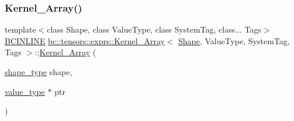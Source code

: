 \mbox{\label{structbc_1_1tensors_1_1exprs_1_1Kernel__Array_aabd83677fd69cc08ffdc444335bcfee5}} 
\subsubsection{\texorpdfstring{Kernel\+\_\+\+Array()}{Kernel\_Array()}\hspace{0.1cm}{\footnotesize\ttfamily [2/3]}}
{\footnotesize\ttfamily template$<$class Shape, class Value\+Type, class System\+Tag, class... Tags$>$ \\
\hyperlink{common_8h_a6699e8b0449da5c0fafb878e59c1d4b1}{B\+C\+I\+N\+L\+I\+NE} \hyperlink{structbc_1_1tensors_1_1exprs_1_1Kernel__Array}{bc\+::tensors\+::exprs\+::\+Kernel\+\_\+\+Array}$<$ \hyperlink{structbc_1_1Shape}{Shape}, Value\+Type, System\+Tag, Tags $>$\+::\hyperlink{structbc_1_1tensors_1_1exprs_1_1Kernel__Array}{Kernel\+\_\+\+Array} (\begin{DoxyParamCaption}\item[{\hyperlink{structbc_1_1tensors_1_1exprs_1_1Kernel__Array_ae6a4db456a47818cda06bb76d05a3b6e}{shape\+\_\+type}}]{shape,  }\item[{\hyperlink{structbc_1_1tensors_1_1exprs_1_1Kernel__Array_ae8195ebc960dd40b6c731a269c00e37b}{value\+\_\+type} $\ast$}]{ptr }\end{DoxyParamCaption})\hspace{0.3cm}{\ttfamily [inline]}}

\mbox{\label{structbc_1_1tensors_1_1exprs_1_1Kernel__Array_a07ea2391c45d7a07913bcf361e4ecc22}} 

